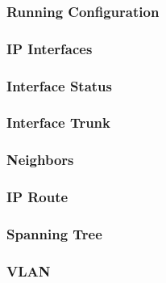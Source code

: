 \subsubsection{Running Configuration}


\subsubsection{IP Interfaces}


\subsubsection{Interface Status}


\subsubsection{Interface Trunk}


\subsubsection{Neighbors}


\subsubsection{IP Route}


\subsubsection{Spanning Tree}


\subsubsection{VLAN}
